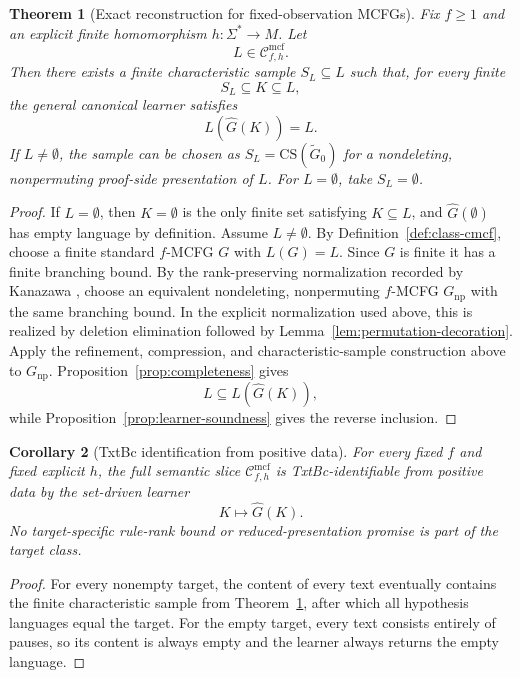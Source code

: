 \documentclass[11pt,a4paper]{article}
\numberwithin{equation}{section}
\theoremstyle{plain}
\newtheorem{theorem}{Theorem}[section]
\newtheorem{corollary}[theorem]{Corollary}
\theoremstyle{definition}
\theoremstyle{remark}
\newcommand{\CS}{\mathrm{CS}}
\newcommand{\Cmcf}[2]{\mathcal{C}^{\mathrm{mcf}}_{#1,#2}}
\begin{document}
\begin{theorem}[Exact reconstruction for fixed-observation MCFGs]
\label{thm:exact-reconstruction}
Fix \(f\ge1\) and an explicit finite homomorphism \(h:\Sigma^*\to M\).  Let
\[
  L\in\Cmcf{f}{h}.
\]
Then there exists a finite characteristic sample \(S_L\subseteq L\) such that,
for every finite
\[
  S_L\subseteq K\subseteq L,
\]
the general canonical learner satisfies
\[
  L(\widehat G(K))=L.
\]
If \(L\ne\emptyset\), the sample can be chosen as
\(S_L=\CS(\widetilde G_0)\) for a nondeleting, nonpermuting proof-side
presentation of \(L\).  For \(L=\emptyset\), take \(S_L=\emptyset\).
\end{theorem}

\begin{proof}
If \(L=\emptyset\), then \(K=\emptyset\) is the only finite set satisfying
\(K\subseteq L\), and \(\widehat G(\emptyset)\) has empty language by
definition.  Assume \(L\ne\emptyset\).  By Definition~\ref{def:class-cmcf}, choose a finite
standard \(f\)-MCFG \(G\) with \(L(G)=L\).  Since \(G\) is finite it has a
finite branching bound.  By the rank-preserving normalization recorded by
Kanazawa \cite[Section~2]{Kanazawa2019Ogden}, choose an equivalent nondeleting,
nonpermuting \(f\)-MCFG \(G_{\mathrm{np}}\) with the same branching bound.  In the
explicit normalization used above, this is realized by deletion elimination
\cite[Lemma~2.2]{SekiEtAl1991} followed by
Lemma~\ref{lem:permutation-decoration}.  Apply the refinement, compression, and characteristic-sample
construction above to \(G_{\mathrm{np}}\).  Proposition~\ref{prop:completeness}
gives
\[
  L\subseteq L(\widehat G(K)),
\]
while Proposition~\ref{prop:learner-soundness} gives the reverse inclusion.
\end{proof}

\begin{corollary}[TxtBc identification from positive data]
\label{cor:semantic-identification}
For every fixed \(f\) and fixed explicit \(h\), the full semantic slice
\(\Cmcf{f}{h}\) is TxtBc-identifiable from positive data by the set-driven
learner
\[
  K\longmapsto\widehat G(K).
\]
No target-specific rule-rank bound or reduced-presentation promise is part of the target class.
\end{corollary}

\begin{proof}
For every nonempty target, the content of every text eventually contains the
finite characteristic sample from Theorem~\ref{thm:exact-reconstruction},
after which all hypothesis languages equal the target.  For the empty target,
every text consists entirely of pauses, so its content is always empty and the
learner always returns the empty language.
\end{proof}
\end{document}
